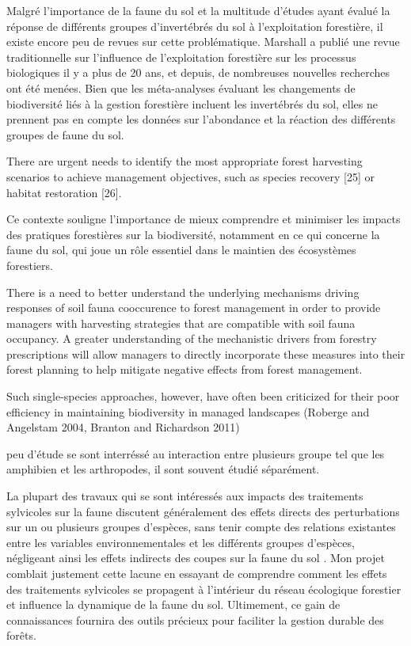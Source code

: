 Malgré l'importance de la faune du sol et la multitude d'études ayant évalué la réponse de différents groupes d'invertébrés du sol à l'exploitation forestière, il existe encore peu de revues sur cette problématique. 
Marshall a publié une revue traditionnelle sur l'influence de l'exploitation forestière sur les processus biologiques il y a plus de 20 ans, et depuis, de nombreuses nouvelles recherches ont été menées. 
Bien que les méta-analyses évaluant les changements de biodiversité liés à la gestion forestière incluent les invertébrés du sol, elles ne prennent pas en compte les données sur l'abondance et la réaction des différents groupes de faune du sol.


There are urgent needs to identify the most appropriate forest harvesting scenarios to achieve management objectives, such as species recovery [25] or habitat restoration [26].

Ce contexte souligne l'importance de mieux comprendre et minimiser les impacts des pratiques forestières sur la biodiversité, notamment en ce qui concerne la faune du sol, qui joue un rôle essentiel dans le maintien des écosystèmes forestiers.


There is a need to better understand the underlying mechanisms driving responses of soil fauna cooccurence to forest management in order to provide managers with harvesting strategies that are compatible with soil fauna occupancy.
A greater understanding of the mechanistic drivers from forestry prescriptions will allow managers to directly incorporate these measures into their forest planning to help mitigate negative effects from forest management.

Such single-species approaches, however, have often been criticized for their poor efficiency in maintaining biodiversity in managed landscapes (Roberge and Angelstam 2004, Branton and Richardson 2011)

peu d'étude se sont interréssé au interaction entre plusieurs groupe tel que les amphibien et les arthropodes, il sont souvent étudié séparément.

La plupart des travaux qui se sont intéressés aux impacts des traitements sylvicoles sur la faune discutent généralement des effets directs des perturbations sur un ou plusieurs groupes d'espèces, 
sans tenir compte des relations existantes entre les variables environnementales et les différents groupes d'espèces, 
négligeant ainsi les effets indirects des coupes sur la faune du sol \citep{josephIntegratingOccupancyModels2016,Pollierer2021Diversityfunctional,Kudrin2023metaanalysiseffects}. 
Mon projet comblait justement cette lacune en essayant de comprendre comment les effets des traitements sylvicoles se propagent à l’intérieur du réseau écologique forestier et influence la dynamique de la faune du sol.  
Ultimement, ce gain de connaissances fournira des outils précieux pour faciliter la gestion durable des forêts.

